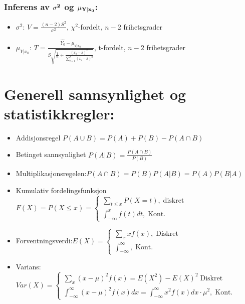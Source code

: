 \documentclass[8pt,a4paper,twocolumn,twoside]{article}
\begin{document}
\subsubsection*{Inferens av $\bold{\sigma^2}$ og $\bold{\mu_{Y|x_0}}$:}
\begin{itemize}[topsep=0pt,itemsep=0pt, partopsep=0pt]
    \item $\sigma^2$: $V=\frac{(n-2)S^2}{\sigma^2}$, $\chi^2$-fordelt, $n-2$ frihetsgrader
    \item $\mu_{Y|x_0}$: $T=\frac{\hat{Y_0}-\mu_{Y|x_0}}{S\sqrt{\frac{1}{n}+\frac{(x_0-\overline{x})^2}{\sum_{i=1}^n(x_i-\overline{x})^2}}}$, t-fordelt, $n-2$ frihetsgrader
\end{itemize}

%
%
\section*{Generell sannsynlighet og statistikkregler:}
\begin{itemize}[topsep=0pt,itemsep=0pt, partopsep=0pt]
    \item Addisjonsregel $P(A\cup B)=P(A)+P(B)-P(A\cap B)$
    \item Betinget sannsynlighet $P(A|B)=\frac{P(A\cap B)}{P(B)}$
    \item Multiplikasjonsregelen:$P(A\cap B)=P(B)P(A|B)=P(A)P(B|A)$
    \item Kumulativ fordelingsfunksjon $F(X)=P(X\leq x)=\begin{cases}
        \sum_{t\leq x} P(X=t),\;\text{diskret}\\
        \int_{-\infty}^x f(t)dt,\;\text{Kont.}
    \end{cases}$
    \item Forventningsverdi:$E(X)=\begin{cases}
        \sum_x xf(x),\;\text{Diskret}\\
        \int_{-\infty}^\infty,\;\text{Kont.}
    \end{cases}$
    \item Varians:\\$Var(X)=\begin{cases}
        \sum_x(x-\mu)^2f(x)=E(X^2)-E(X)^2\;\text{Diskret}\\
        \int_{-\infty}^\infty (x-\mu)^2f(x)dx = \int_{-\infty}^{\infty}x^2f(x)dx\cdot\mu^2,\;\text{Kont.}
    \end{cases}$
\end{itemize}
%
%
\end{document}
